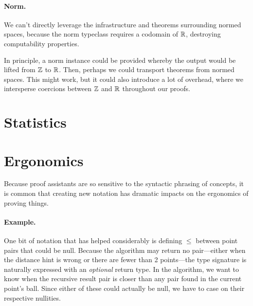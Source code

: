 \documentclass{article}
\begin{document}
\paragraph{Norm.}
We can't directly leverage the infrastructure and theorems surrounding normed spaces, because the norm typeclass requires a codomain of $\mathbb{R}$, destroying computability properties.

In principle, a norm instance could be provided whereby the output would be lifted from $\mathbb{Z}$ to $\mathbb{R}$.
Then, perhaps we could transport theorems from normed spaces.
This might work, but it could also introduce a lot of overhead, where we intersperse coercions between $\mathbb{Z}$ and $\mathbb{R}$ throughout our proofs.


\section{Statistics}

\section{Ergonomics}
Because proof assistants are so sensitive to the syntactic phrasing of concepts, it is common that creating new notation has dramatic impacts on the ergonomics of proving things.

\paragraph{Example.}
One bit of notation that has helped considerably is defining $\leq$ between point pairs that could be null.
Because the algorithm may return no pair---either when the distance hint is wrong or there are fewer than 2 points---the type signature is naturally expressed with an \textit{optional} return type.
In the algorithm, we want to know when the recursive result pair is closer than any pair found in the current point's ball.
Since either of these could actually be null, we have to case on their respective nullities.
\end{document}
